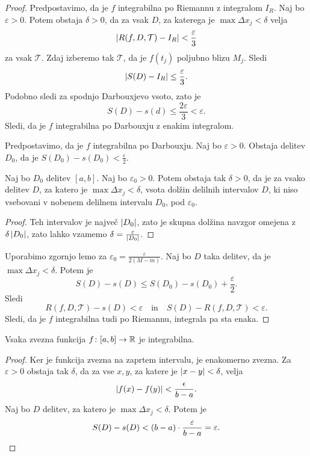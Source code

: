 \documentclass[12pt, a4paper]{article}
\begin{document}
\begin{proof}
Predpostavimo, da je $f$ integrabilna po Riemannu z integralom $I_R$. Naj bo $\varepsilon>0$. Potem obstaja $\delta>0$, da za vsak $D$, za katerega je $\max\Delta x_j<\delta$ velja
\[
\left\lvert R(f,D,\mathcal{T})-I_R\right\rvert<\frac{\varepsilon}{3}
\]
za vsak $\mathcal{T}$. Zdaj izberemo tak $\mathcal{T}$, da je $f(t_j)$ poljubno blizu $M_j$. Sledi
\[
\left\lvert S(D)-I_R\right\rvert\leq\frac{\varepsilon}{3}.
\]
Podobno sledi za spodnjo Darbouxjevo vsoto, zato je
\[
S(D)-s(d)\leq\frac{2\varepsilon}{3}<\varepsilon.
\]
Sledi, da je $f$ integrabilna po Darbouxju z enakim integralom.

Predpostavimo, da je $f$ integrabilna po Darbouxju. Naj bo $\varepsilon>0$. Obstaja delitev $D_0$, da je $S(D_0)-s(D_0)<\frac{\varepsilon}{2}$.

\begin{lema*}
Naj bo $D_0$ delitev $[a,b]$. Naj bo $\varepsilon_0>0$. Potem obstaja tak $\delta>0$, da je za vsako delitev $D$, za katero je $\max\Delta x_j<\delta$, vsota dolžin delilnih intervalov $D$, ki niso vsebovani v nobenem delilnem intervalu $D_0$, pod $\varepsilon_0$.
\end{lema*}

\begin{proof}
Teh intervalov je največ $\left\lvert D_0\right\rvert$, zato je skupna dolžina navzgor omejena z $\delta\left\lvert D_0\right\rvert$, zato lahko vzamemo $\delta=\frac{\varepsilon}{\left\lvert D_0\right\rvert}$.
\end{proof}

Uporabimo zgornjo lemo za $\varepsilon_0=\frac{\varepsilon}{2(M-m)}$. Naj bo $D$ taka delitev, da je $\max\Delta x_j<\delta$. Potem je
\[
S(D)-s(D)\leq S(D_0)-s(D_0) + \frac{\varepsilon}{2}.
\]
Sledi
\[
R(f,D,\mathcal{T})-s(D)<\varepsilon\quad\text{in}\quad S(D)-R(f,D,\mathcal{T})<\varepsilon.
\]
Sledi, da je $f$ integrabilna tudi po Riemannu, integrala pa sta enaka.
\end{proof}

\begin{izrek}
Vsaka zvezna funkcija $f\colon[a,b]\to\mathbb{R}$ je integrabilna.
\end{izrek}

\begin{proof}
Ker je funkcija zvezna na zaprtem intervalu, je enakomerno zvezna. Za $\varepsilon>0$ obstaja tak $\delta$, da za vse $x,y$, za katere je $\left\lvert x-y\right\rvert<\delta$, velja
\[
\left\lvert f(x)-f(y)\right\rvert<\frac{\epsilon}{b-a}.
\]
Naj bo $D$ delitev, za katero je $\max\Delta x_j<\delta$. Potem je
\[
S(D)-s(D)<(b-a)\cdot\frac{\varepsilon}{b-a}=\varepsilon.\qedhere
\]
\end{proof}
\end{document}
